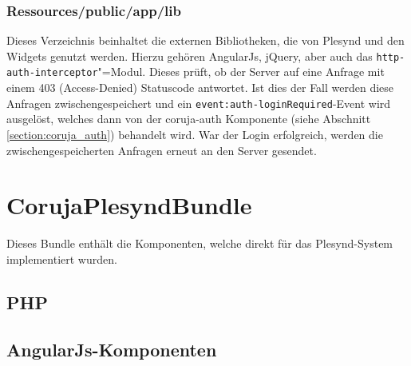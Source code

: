 \subsubsection*{Ressources/public/app/lib}
Dieses Verzeichnis beinhaltet die externen Bibliotheken, die von Plesynd und den Widgets genutzt werden. Hierzu gehören AngularJs, jQuery, aber auch das \texttt{http-\allowbreak auth-\allowbreak interceptor}"=Modul. Dieses prüft, ob der Server auf eine Anfrage mit einem 403 (Access-Denied) Statuscode antwortet. Ist dies der Fall werden diese Anfragen zwischengespeichert und ein \texttt{event:\allowbreak auth-\allowbreak loginRequired}-Event wird ausgelöst, welches dann von der coruja-auth Komponente (siehe Abschnitt \ref{section:coruja_auth}) behandelt wird. War der Login erfolgreich, werden die zwischengespeicherten Anfragen erneut an den Server gesendet. 

\section{CorujaPlesyndBundle}
Dieses Bundle enthält die Komponenten, welche direkt für das Plesynd-System implementiert wurden.

\subsection{PHP}

\subsection{AngularJs-Komponenten}

